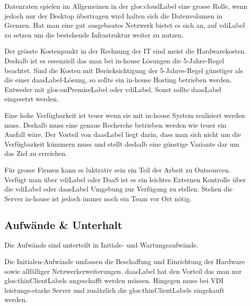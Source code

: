 Datenraten spielen im Allgemeinen in der \Gls{glos:cloudLabel} eine grosse Rolle, wenn jedoch nur der Desktop übertragen wird halten sich die Datenvolumen in Grenzen. Hat man eine gut ausgebautes Netzwerk bietet es sich an, auf \Gls{vdiLabel} zu setzen um die bestehende Infrastruktur weiter zu nutzen.

Der grösste Kostenpunkt in der Rechnung der IT sind meist die Hardwarekosten. Deshalb ist es essenziell das man bei in-house Lösungen die 5-Jahre-Regel beachtet. Sind die Kosten mit Berücksichtigung der 5-Jahres-Regel günstiger als die einer \Gls{daasLabel}-Lösung, so sollte ein in-house Hosting betrieben werden. Entweder mit \gls{glos:onPremiseLabel} oder \Gls{vdiLabel}. Sonst sollte \Gls{daasLabel} eingesetzt werden.

Eine hohe Verfügbarkeit ist teuer wenn sie mit in-house System realisiert werden muss. Deshalb muss eine genaue Recherche betrieben werden wie teuer ein Ausfall wäre. Der Vorteil von \Gls{daasLabel} liegt darin, dass man sich nicht um die Verfügbarkeit kümmern muss und stellt deshalb eine günstige Variante dar um das Ziel zu erreichen.

Für grosse Firmen kann es luktrativ sein ein Teil der Arbeit zu Outsourcen. Verfügt man über \Gls{vdiLabel} oder DaaS ist es ein leichtes Externen Kontrolle über die \Gls{vdiLabel} oder \Gls{daasLabel} Umgebung zur Verfügung zu stellen. Stehen die Server in-house ist jedoch immer noch ein Team vor Ort nötig.

\subsection{Aufwände \& Unterhalt}




Die Aufwände sind unterteilt in Initiale- und Wartungsaufwände.

Die Initialen-Aufwände umfassen die Beschaffung und Einrichtung der Hardware sowie allfälliger Netzwerkerweiterungen. \Gls{daasLabel} hat den Vorteil das man nur \glspl{glos:thinClientLabel} angeschafft werden müssen. Hingegen muss bei VDI leistungs-starke Server und zusätzlich die \glspl{glos:thinClientLabel} eingekauft werden.

